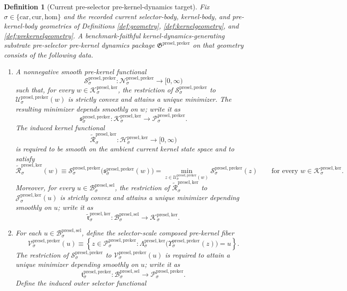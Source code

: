 \documentclass[11pt]{article}
\newcommand{\Car}{\mathrm{car}}
\newcommand{\Cur}{\mathrm{cur}}
\newcommand{\Hom}{\mathrm{hom}}
\newcommand{\PreSectionSelectorBody}[1]{\mathcal B_{#1}^{\mathrm{presel,sel}}}
\newcommand{\KernelSpace}[1]{\mathcal H_{#1}^{\mathrm{presel,ker}}}
\newcommand{\KernelBody}[1]{\mathcal K_{#1}^{\mathrm{presel,ker}}}
\newcommand{\KernelProj}[1]{\Lambda_{#1}^{\mathrm{presel,ker}}}
\newcommand{\KernelFiber}[2]{\mathcal J_{#1}^{\mathrm{presel,ker}}(#2)}
\newcommand{\PreKernelPackage}{\mathfrak G^{\mathrm{presel,preker}}}
\newcommand{\PreKernelSpace}[1]{\mathcal N_{#1}^{\mathrm{presel,preker}}}
\newcommand{\PreKernelBody}[1]{\mathcal P_{#1}^{\mathrm{presel,preker}}}
\newcommand{\PreKernelProj}[1]{\Upsilon_{#1}^{\mathrm{presel,preker}}}
\newcommand{\PreKernelFiber}[2]{\mathcal U_{#1}^{\mathrm{presel,preker}}(#2)}
\newcommand{\PreKernelFunctional}[1]{\mathscr S_{#1}^{\mathrm{presel,preker}}}
\newcommand{\PreKernelMinLift}[1]{\mathfrak s_{#1}^{\mathrm{presel,preker}}}
\newcommand{\PreKernelComposedFiber}[2]{\mathcal V_{#1}^{\mathrm{presel,preker}}(#2)}
\newcommand{\PreKernelComposedMin}[1]{\mathfrak t_{#1}^{\mathrm{presel,preker}}}
\newcommand{\InducedKernelFunctional}[1]{\widetilde{\mathscr R}_{#1}^{\mathrm{presel,ker}}}
\newcommand{\InducedKernelMinLift}[1]{\widetilde{\mathfrak r}_{#1}^{\mathrm{presel,ker}}}
\newtheorem{definition}{Definition}
\begin{document}
\begin{definition}[Current pre-selector pre-kernel-dynamics target]
\label{def:prekerneltarget}
Fix \(\sigma\in\{\Car,\Cur,\Hom\}\) and the recorded current selector-body, kernel-body, and pre-kernel-body geometries of Definitions \ref{def:geometry}, \ref{def:kernelgeometry}, and \ref{def:prekernelgeometry}. A \emph{benchmark-faithful kernel-dynamics-generating substrate pre-selector pre-kernel dynamics package} \(\PreKernelPackage\) on that geometry consists of the following data.
\begin{enumerate}
    \item A nonnegative smooth pre-kernel functional
    \[
    \PreKernelFunctional{\sigma}:\PreKernelSpace{\sigma}\to[0,\infty)
    \]
    such that, for every \(w\in\KernelBody{\sigma}\), the restriction of \(\PreKernelFunctional{\sigma}\) to \(\PreKernelFiber{\sigma}{w}\) is strictly convex and attains a unique minimizer. The resulting minimizer depends smoothly on \(w\); write it as
    \[
    \PreKernelMinLift{\sigma}:\KernelBody{\sigma}\to\PreKernelBody{\sigma}.
    \]
    The induced kernel functional
    \[
    \InducedKernelFunctional{\sigma}:\KernelSpace{\sigma}\to[0,\infty)
    \]
    is required to be smooth on the ambient current kernel state space and to satisfy
    \[
    \InducedKernelFunctional{\sigma}(w)
    \equiv
    \PreKernelFunctional{\sigma}\bigl(\PreKernelMinLift{\sigma}(w)\bigr)
    =
    \min_{z\in\PreKernelFiber{\sigma}{w}}
    \PreKernelFunctional{\sigma}(z)
    \qquad
    \text{for every }
    w\in\KernelBody{\sigma}.
    \]
    Moreover, for every \(u\in\PreSectionSelectorBody{\sigma}\), the restriction of \(\InducedKernelFunctional{\sigma}\) to \(\KernelFiber{\sigma}{u}\) is strictly convex and attains a unique minimizer depending smoothly on \(u\); write it as
    \[
    \InducedKernelMinLift{\sigma}:\PreSectionSelectorBody{\sigma}\to\KernelBody{\sigma}.
    \]
    \item For each \(u\in\PreSectionSelectorBody{\sigma}\), define the selector-scale composed pre-kernel fiber
    \[
    \PreKernelComposedFiber{\sigma}{u}
    \equiv
    \left\{
    z\in\PreKernelBody{\sigma}:
    \KernelProj{\sigma}\bigl(\PreKernelProj{\sigma}(z)\bigr)=u
    \right\}.
    \]
    The restriction of \(\PreKernelFunctional{\sigma}\) to \(\PreKernelComposedFiber{\sigma}{u}\) is required to attain a unique minimizer depending smoothly on \(u\); write it as
    \[
    \PreKernelComposedMin{\sigma}:\PreSectionSelectorBody{\sigma}\to\PreKernelBody{\sigma}.
    \]
    Define the induced outer selector functional

\end{enumerate}
\end{definition}
\end{document}
